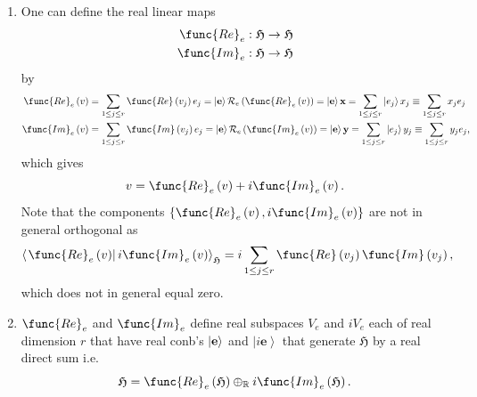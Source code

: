 \documentclass[aps,preprint]{revtex4}
\begin{document}
\begin{enumerate}
\item One can define the real linear maps 
\begin{align}
\func{Re}_{e}& :\mathfrak{H\rightarrow H} \\
\func{Im}_{e}& :\mathfrak{H\rightarrow H}
\end{align}%
by%
\begin{align}
\func{Re}_{e}\left( v\right) & =\sum_{1\leq j\leq r}\func{Re}\left(
v_{j}\right) e_{j}=\left\vert \mathbf{e}\right\rangle \mathcal{R}_{e}\left( 
\func{Re}_{e}\left( v\right) \right) =\left\vert \mathbf{e}\right\rangle 
\mathbf{x}=\sum_{1\leq j\leq r}\left\vert e_{j}\right\rangle x_{j}\equiv
\sum_{1\leq j\leq r}x_{j}e_{j} \\
\func{Im}_{e}\left( v\right) & =\sum_{1\leq j\leq r}\func{Im}\left(
v_{j}\right) e_{j}=\left\vert \mathbf{e}\right\rangle \mathcal{R}_{e}\left( 
\func{Im}_{e}\left( v\right) \right) =\left\vert \mathbf{e}\right\rangle 
\mathbf{y}=\sum_{1\leq j\leq r}\left\vert e_{j}\right\rangle y_{j}\equiv
\sum_{1\leq j\leq r}y_{j}e_{j},
\end{align}%
which gives 
\begin{equation}
v=\func{Re}_{e}\left( v\right) +i\func{Im}_{e}\left( v\right) .
\end{equation}%
Note that the components $\left\{ \func{Re}_{e}\left( v\right) ,i\func{Im}%
_{e}\left( v\right) \right\} $ are not in general orthogonal as%
\begin{equation}
\left\langle \left. \func{Re}_{e}\left( v\right) \right\vert i\func{Im}%
_{e}\left( v\right) \right\rangle _{\mathfrak{H}}=i\sum_{1\leq j\leq r}\func{%
Re}\left( v_{j}\right) \func{Im}\left( v_{j}\right) ,
\end{equation}%
which does not in general equal zero.

\item $\func{Re}_{e}$ and $\func{Im}_{e}$ define real subspaces $V_{e}$ and $%
iV_{e}$ each of real dimension $r$ that have real conb's $\left\vert \mathbf{%
e}\right\rangle $ and $\left\vert i\mathbf{e}\right\rangle $ that generate $%
\mathfrak{H}$ by a real direct sum i.e. 
\begin{equation}
\mathfrak{H}=\func{Re}_{e}\left( \mathfrak{H}\right) \oplus _{\mathbb{R}}i%
\func{Im}_{e}\left( \mathfrak{H}\right) .
\end{equation}


\end{enumerate}
\end{document}
